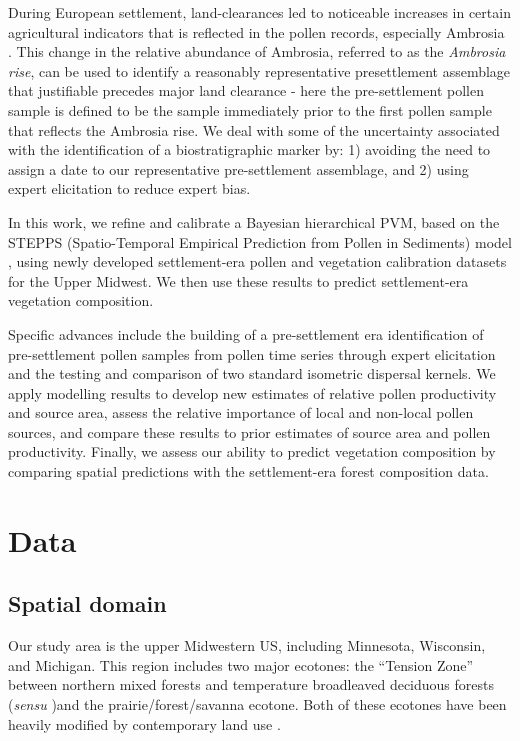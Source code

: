 \documentclass[12pt]{article}
\begin{document}
During European settlement, land-clearances led to noticeable
increases in certain agricultural indicators that is reflected in the
pollen records, especially Ambrosia \citep{mcandrews1988human}. This
change in the relative abundance of Ambrosia, referred to as the
\textit{Ambrosia rise}, can be used to identify a reasonably
representative presettlement assemblage that justifiable precedes
major land clearance - here the pre-settlement pollen sample is
defined to be the sample immediately prior to the first pollen sample
that reflects the Ambrosia rise. We deal with some of the uncertainty
associated with the identification of a biostratigraphic marker by: 1)
avoiding the need to assign a date to our representative
pre-settlement assemblage, and 2) using expert elicitation to reduce
expert bias.

In this work, we refine and calibrate a Bayesian hierarchical PVM,
based on the STEPPS (Spatio-Temporal Empirical Prediction from Pollen
in Sediments) model \citep{paciorek2009mapping}, using newly developed
settlement-era pollen and vegetation calibration datasets for the
Upper Midwest. We then use these results to predict settlement-era
vegetation composition.

Specific advances include the building of a pre-settlement era
identification of pre-settlement pollen samples from pollen time
series through expert elicitation and the testing and comparison of
two standard isometric dispersal kernels. We apply modelling results
to develop new estimates of relative pollen productivity and source
area, assess the relative importance of local and non-local pollen
sources, and compare these results to prior estimates of source area
and pollen productivity. Finally, we assess our ability to predict
vegetation composition by comparing spatial predictions with the
settlement-era forest composition data.

\section{Data}

\subsection{Spatial domain}

Our study area is the upper Midwestern US, including Minnesota,
Wisconsin, and Michigan.  This region includes two major ecotones: the
``Tension Zone'' between northern mixed forests and temperature
broadleaved deciduous forests (\textit{sensu}
\citet{curtis1959vegetation})and the prairie/forest/savanna ecotone.
Both of these ecotones have been heavily modified by contemporary land
use \citep{goring_witness}.
\end{document}
